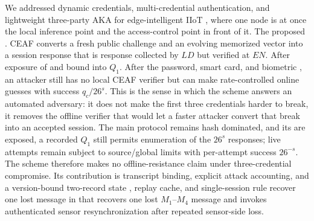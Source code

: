 \documentclass[cmc,article,submit,moreauthors,pdftex]{Definitions/tsp}
\providecommand{\DIFadd}[1]{{\protect\color{blue} \sf #1}} %
\providecommand{\DIFdel}[1]{{\protect\color{red} \scriptsize #1}} %
\providecommand{\DIFaddbegin}{} %
\providecommand{\DIFaddend}{} %
\providecommand{\DIFdelbegin}{} %
\providecommand{\DIFdelend}{} %
\begin{document}
We addressed dynamic credentials, multi-credential authentication, and lightweight three-party AKA for edge-intelligent IIoT\DIFdelbegin \DIFdel{, where one node is at once the local inference point and the access-control point in front of it. The proposed }\DIFdelend \DIFaddbegin \DIFadd{. }\DIFaddend CEAF converts a fresh public challenge and an evolving memorized vector into a \DIFdelbegin \DIFdel{session response that is }\DIFdelend \DIFaddbegin \DIFadd{response }\DIFaddend collected by $LD$ \DIFdelbegin \DIFdel{but verified at $EN$. After exposure of }\DIFdelend \DIFaddbegin \DIFadd{and bound into $Q_1$. After }\DIFaddend the password, smart card, and biometric \DIFdelbegin \DIFdel{, an attacker still has no local CEAF verifier but can make rate-controlled online guesses with success $q_c/26^s$. This is the sense in which the scheme answers an automated adversary: it does not make the first three credentials harder to break, it removes the offline verifier that would let a faster attacker convert that break into an accepted session. The main protocol remains hash dominated, and its }\DIFdelend \DIFaddbegin \DIFadd{are exposed, a recorded $Q_1$ still permits enumeration of the $26^s$ responses; live attempts remain subject to source/global limits with per-attempt success $26^{-s}$. The scheme therefore makes no offline-resistance claim under three-credential compromise. Its contribution is transcript binding, explicit attack accounting, and a }\DIFaddend version-bound two-record state \DIFdelbegin \DIFdel{, replay cache, and single-session rule recover one lost message in }\DIFdelend \DIFaddbegin \DIFadd{that recovers one lost }\DIFaddend $M_1$--$M_4$ \DIFaddbegin \DIFadd{message and invokes authenticated sensor resynchronization after repeated sensor-side loss}\DIFaddend .
\end{document}
